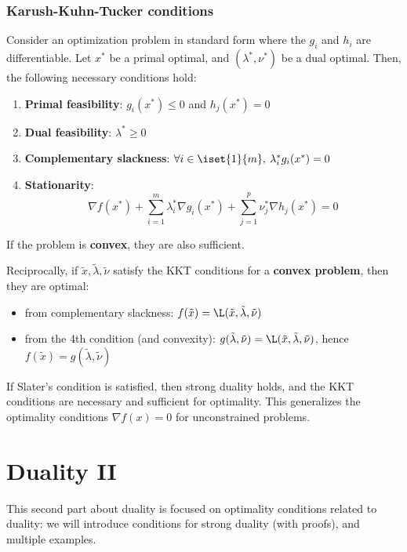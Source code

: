 \subsubsection{Karush-Kuhn-Tucker conditions}
\begin{theorem}
    Consider an optimization problem in standard form where the $g_i$ and $h_i$ are differentiable. Let $x^*$ be a primal optimal, and $(\lambda^*, \nu^*)$ be a dual optimal. Then, the following necessary conditions hold:
    \begin{enumerate}
        \item \textbf{Primal feasibility}: $g_i(x^*)\leq0$ and $h_j(x^*)=0$
        \item \textbf{Dual feasibility}: $\lambda^*\geq0$
        \item \textbf{Complementary slackness}: $\forall i\in\iset{1}{m}, \: \lambda_i^*g_i(x^*)=0$
        \item \textbf{Stationarity}:
        \begin{equation*}
            \nabla f(x^*) + \sum_{i=1}^m\lambda_i^*\nabla g_i(x^*) + \sum_{j=1}^p\nu_j^*\nabla h_j(x^*) = 0
        \end{equation*}
    \end{enumerate}
    If the problem is \textbf{convex}, they are also sufficient.
\end{theorem}

Reciprocally, if $\tilde{x}, \tilde{\lambda}, \tilde{\nu}$ satisfy the KKT conditions for a \textbf{convex problem}, then they are optimal:
\begin{itemize}
    \item from complementary slackness: $f(\tilde{x})=\L(\tilde{x}, \tilde{\lambda}, \tilde{\nu})$
    \item from the 4th condition (and convexity): $g(\tilde{\lambda}, \tilde{\nu})=\L(\tilde{x}, \tilde{\lambda}, \tilde{\nu})$, hence $f(\tilde{x})=g(\tilde{\lambda}, \tilde{\nu})$
\end{itemize}
If Slater's condition is satisfied, then strong duality holds, and the KKT conditions are necessary and sufficient for optimality. This generalizes the optimality conditions $\nabla f(x)=0$ for unconstrained problems.


\newpage
\section{Duality II}
This second part about duality is focused on optimality conditions related to duality: we will introduce conditions for strong duality (with proofs), and multiple examples.

